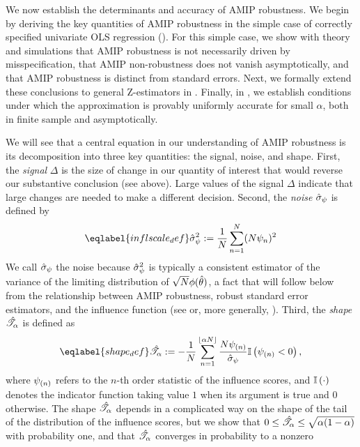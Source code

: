 We now establish the determinants and accuracy of AMIP robustness. We begin by
deriving the key quantities of AMIP robustness in the simple case of correctly
specified univariate OLS regression (). For this
simple case, we show with theory and simulations that AMIP robustness is not
necessarily driven by misspecification, that AMIP non-robustness does not vanish
asymptotically, and that AMIP robustness is distinct from standard errors. Next,
we formally extend these conclusions to general Z-estimators in
.  Finally, in , we establish
conditions under which the approximation is provably uniformly accurate for
small $\alpha$, both in finite sample and asymptotically.

We will see that a central equation in our understanding of AMIP robustness is
its decomposition into three key quantities: the signal, noise, and shape.
First, the \emph{signal} $\Delta$ is the size of change in our quantity of
interest that would reverse our substantive conclusion (see
 above). Large values of the signal $\Delta$ indicate
that large changes are needed to make a different decision.  Second, the
\emph{noise} $\hat{\sigma}_{\psi}$ is defined by
%
\begin{align}\eqlabel{inflscale_def}
%
\inflscale^2 := \meann (N \infl_n)^2
%
\end{align}
%
We call $\hat{\sigma}_{\psi}$ the noise because $\hat{\sigma}_{\psi}^2$ is typically a consistent
estimator of the variance of the limiting distribution of $\sqrt{N}
\phi(\hat{\theta})$, a fact that will follow below from the relationship
between AMIP robustness, robust standard error estimators, and the influence
function (see  or, more
generally, ).
Third, the \emph{shape} $\hat{\mathscr{T}}_\alpha$ is defined as
%
\begin{align}\eqlabel{shape_def}
%
\shape := -\frac{1}{N}
\sum_{n=1}^{\lfloor \alpha N \rfloor} \frac{N \infl_{(n)}}{\inflscale}
\ind{\infl_{(n)} < 0},
%
\end{align}
%
where $\psi_{(n)}$ refers to the $n$-th order statistic of the influence
scores, and $\mathbb{I}\left(\cdot\right)$ denotes the indicator function taking value $1$ when
its argument is true and $0$ otherwise. The shape $\hat{\mathscr{T}}_\alpha$ depends in a
complicated way on the shape of the tail of the distribution of the influence
scores, but we show that $0 \le \hat{\mathscr{T}}_\alpha \le \sqrt{\alpha(1 - \alpha)}$ with
probability one, and that $\hat{\mathscr{T}}_\alpha$ converges in probability to a nonzero

